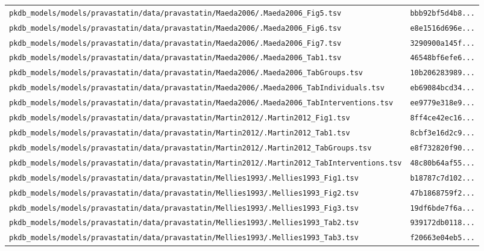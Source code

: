 \documentclass{article}
\begin{document}
\begin{longtable}{ll}
\texttt{pkdb\_models/models/pravastatin/data/pravastatin/Maeda2006/.Maeda2006\_Fig5.tsv} & \texttt{bbb92bf5d4b8...} \\
\texttt{pkdb\_models/models/pravastatin/data/pravastatin/Maeda2006/.Maeda2006\_Fig6.tsv} & \texttt{e8e1516d696e...} \\
\texttt{pkdb\_models/models/pravastatin/data/pravastatin/Maeda2006/.Maeda2006\_Fig7.tsv} & \texttt{3290900a145f...} \\
\texttt{pkdb\_models/models/pravastatin/data/pravastatin/Maeda2006/.Maeda2006\_Tab1.tsv} & \texttt{46548bf6efe6...} \\
\texttt{pkdb\_models/models/pravastatin/data/pravastatin/Maeda2006/.Maeda2006\_TabGroups.tsv} & \texttt{10b206283989...} \\
\texttt{pkdb\_models/models/pravastatin/data/pravastatin/Maeda2006/.Maeda2006\_TabIndividuals.tsv} & \texttt{eb69084bcd34...} \\
\texttt{pkdb\_models/models/pravastatin/data/pravastatin/Maeda2006/.Maeda2006\_TabInterventions.tsv} & \texttt{ee9779e318e9...} \\
\texttt{pkdb\_models/models/pravastatin/data/pravastatin/Martin2012/.Martin2012\_Fig1.tsv} & \texttt{8ff4ce42ec16...} \\
\texttt{pkdb\_models/models/pravastatin/data/pravastatin/Martin2012/.Martin2012\_Tab1.tsv} & \texttt{8cbf3e16d2c9...} \\
\texttt{pkdb\_models/models/pravastatin/data/pravastatin/Martin2012/.Martin2012\_TabGroups.tsv} & \texttt{e8f732820f90...} \\
\texttt{pkdb\_models/models/pravastatin/data/pravastatin/Martin2012/.Martin2012\_TabInterventions.tsv} & \texttt{48c80b64af55...} \\
\texttt{pkdb\_models/models/pravastatin/data/pravastatin/Mellies1993/.Mellies1993\_Fig1.tsv} & \texttt{b18787c7d102...} \\
\texttt{pkdb\_models/models/pravastatin/data/pravastatin/Mellies1993/.Mellies1993\_Fig2.tsv} & \texttt{47b1868759f2...} \\
\texttt{pkdb\_models/models/pravastatin/data/pravastatin/Mellies1993/.Mellies1993\_Fig3.tsv} & \texttt{19df6bde7f6a...} \\
\texttt{pkdb\_models/models/pravastatin/data/pravastatin/Mellies1993/.Mellies1993\_Tab2.tsv} & \texttt{939172db0118...} \\
\texttt{pkdb\_models/models/pravastatin/data/pravastatin/Mellies1993/.Mellies1993\_Tab3.tsv} & \texttt{f20663e04eb5...} \\

\end{longtable}
\end{document}
